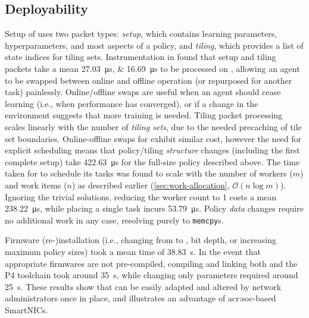 %

\subsection{Deployability}
Setup of \approachshort{} uses two packet types: \emph{setup}, which contains learning parameters, hyperparameters, and most aspects of a policy, and \emph{tiling}, which provides a list of state indices for tiling sets.
Instrumentation in \approachshort{} found that setup and tiling packets take a mean \qtylist{27.03;16.69}{\micro\second} to be processed on \Indfw{}, allowing an agent to be swapped between online and offline operation (or repurposed for another task) painlessly.
Online/offline swaps are useful when an agent should cease learning (i.e., when performance has converged), or if a change in the environment suggests that more training is needed.
Tiling packet processing scales linearly with the number of \emph{tiling sets}, due to the needed precaching of tile set boundaries.
Online-offline swaps for \Coopfw{} exhibit similar cost, however the need for explicit scheduling means that policy/tiling \emph{structure} changes (including the first complete setup) take \qty{422.63}{\micro\second} for the full-size policy described above.
The time taken for \Coopfw{} to schedule its tasks was found to scale with the number of workers ($m$) and work items ($n$) as described earlier (\cref{sec:work-allocation}, $\mathcal{O}{\left(n\log{m}\right)}$).
Ignoring the trivial solutions, reducing the worker count to \num{1} costs a mean \qty{238.22}{\micro\second}, while placing a single task incurs \qty{53.79}{\micro\second}.
Policy \emph{data} changes require no additional work in any case, resolving purely to \texttt{memcpy}s.

Firmware (re-)installation (i.e., changing from \Indfw{} to \Coopfw{}, bit depth, or increasing maximum policy sizes) took a mean time of \qty{38.83}{\second}.
In the event that appropriate firmwares are not pre-compiled, compiling and linking both \approachshort{} and the P4 toolchain took around \qty{35}{\second}, while changing only \approachshort{} parameters required around \qty{25}{\second}.
These results show that \approachshort{} can be easily adapted and altered by network administrators once in place, and illustrates an advantage of \gls{acr:soc}-based SmartNICs.

